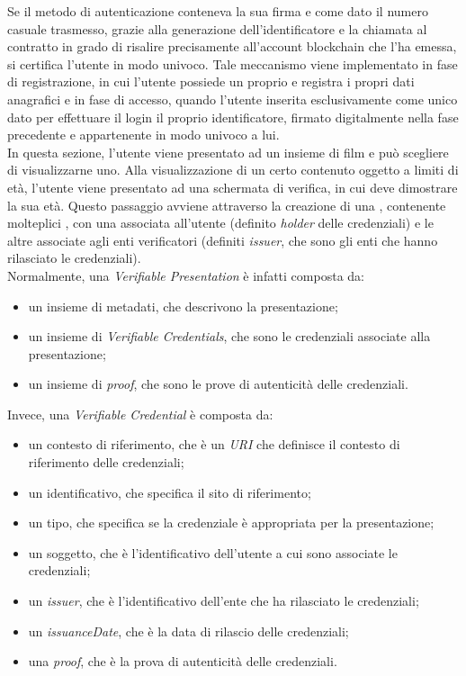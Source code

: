 Se il metodo di autenticazione conteneva la sua firma e come dato il numero casuale trasmesso, grazie alla generazione dell'identificatore
e la chiamata al contratto in grado di risalire precisamente all'account blockchain che l'ha emessa, si certifica l'utente in modo univoco.
Tale meccanismo viene implementato in fase di registrazione, in cui l'utente possiede un proprio  e registra i propri dati anagrafici
e in fase di accesso, quando l'utente inserita esclusivamente come unico dato per effettuare il login il proprio identificatore, firmato digitalmente nella fase precedente e appartenente in modo univoco a lui. \\

In questa sezione, l'utente viene presentato ad un insieme di film e può scegliere di visualizzarne uno. Alla visualizzazione di un certo
contenuto oggetto a limiti di età, l'utente viene presentato ad una schermata di verifica, in cui deve dimostrare la sua età.
Questo passaggio avviene attraverso la creazione di una , contenente molteplici , 
con una associata all'utente (definito \textit{holder} delle credenziali) e le altre associate agli enti verificatori (definiti \textit{issuer}, che sono gli enti che hanno rilasciato le credenziali). \\

Normalmente, una \textit{Verifiable Presentation} è infatti composta da:
\begin{itemize}
    \item un insieme di metadati, che descrivono la presentazione;
    \item un insieme di \textit{Verifiable Credentials}, che sono le credenziali associate alla presentazione;
    \item un insieme di \textit{proof}, che sono le prove di autenticità delle credenziali.
\end{itemize}

Invece, una \textit{Verifiable Credential} è composta da:
\begin{itemize}
    \item un contesto di riferimento, che è un \textit{URI} che definisce il contesto di riferimento delle credenziali;
    \item un identificativo, che specifica il sito di riferimento;
    \item un tipo, che specifica se la credenziale è appropriata per la presentazione;
    \item un soggetto, che è l'identificativo dell'utente a cui sono associate le credenziali;
    \item un \textit{issuer}, che è l'identificativo dell'ente che ha rilasciato le credenziali;
    \item un \textit{issuanceDate}, che è la data di rilascio delle credenziali;
    \item una \textit{proof}, che è la prova di autenticità delle credenziali.
\end{itemize}

